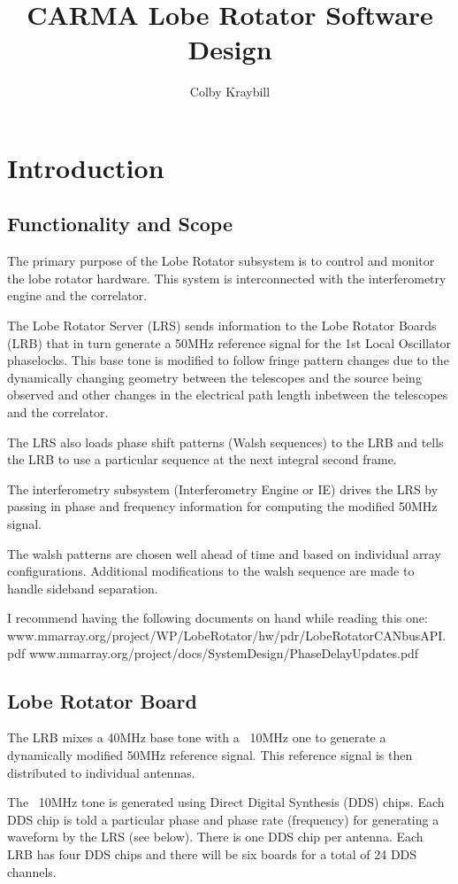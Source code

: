 \documentclass[preprint]{aastex}
\begin{document}
\title{CARMA Lobe Rotator Software Design}
\author{Colby Kraybill}


\section{Introduction}
\subsection{Functionality and Scope}

The primary purpose of the Lobe Rotator subsystem is to control
and monitor the lobe rotator hardware.  This system is interconnected
with the interferometry engine and the correlator.

The Lobe Rotator Server (LRS) sends information to the Lobe Rotator
Boards (LRB) that in turn generate a 50MHz reference signal for the 1st
Local Oscillator phaselocks.  This base tone is modified to follow fringe
pattern changes due to the dynamically changing geometry between the
telescopes and the source being observed and other changes in the
electrical path length inbetween the telescopes and the correlator.

The LRS also loads phase shift patterns (Walsh sequences) to the
LRB and tells the LRB to use a particular sequence at the next integral second
frame.  

The interferometry subsystem (Interferometry Engine or IE) drives the LRS
by passing in phase and frequency information for computing the modified 50MHz
signal.

The walsh patterns are chosen well ahead of time and based on
individual array configurations.  Additional modifications to the walsh
sequence are made to handle sideband separation. 

I recommend having the following documents on hand while reading this one:
www.mmarray.org/project/WP/LobeRotator/hw/pdr/LobeRotatorCANbusAPI.pdf
www.mmarray.org/project/docs/SystemDesign/PhaseDelayUpdates.pdf

\subsection{Lobe Rotator Board}
The LRB mixes a 40MHz base tone with a ~10MHz one to generate
a dynamically modified 50MHz reference signal.  This reference
signal is then distributed to individual antennas.  

The ~10MHz tone is generated using Direct Digital Synthesis (DDS) chips.
Each DDS chip is told a particular phase and phase rate (frequency) for generating
a waveform by the LRS (see below).  There is one DDS chip per
antenna.  Each LRB has four DDS chips and there will be six boards
for a total of 24 DDS channels.
\end{document}
